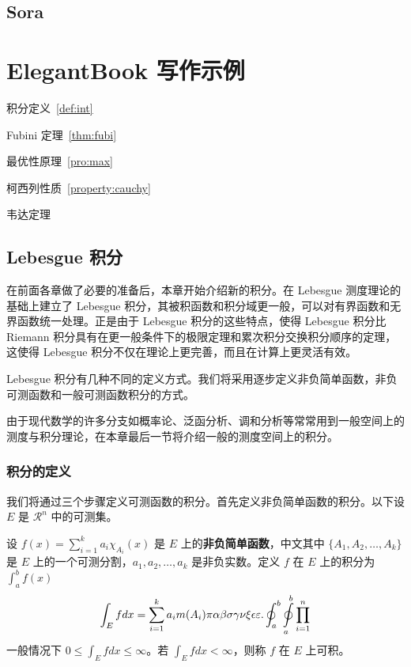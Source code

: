 \documentclass[lang=cn,newtx,10pt,scheme=chinese]{elegantbook}
\begin{document}
\section{Sora}




\chapter{ElegantBook 写作示例}

\begin{introduction}
  \item 积分定义~\ref{def:int}
  \item Fubini 定理~\ref{thm:fubi}
  \item 最优性原理~\ref{pro:max}
  \item 柯西列性质~\ref{property:cauchy}
  \item 韦达定理
\end{introduction}

\section{Lebesgue 积分}
在前面各章做了必要的准备后，本章开始介绍新的积分。在 Lebesgue 测度理论的基础上建立了 Lebesgue 积分，其被积函数和积分域更一般，可以对有界函数和无界函数统一处理。正是由于 Lebesgue 积分的这些特点，使得 Lebesgue 积分比 Riemann 积分具有在更一般条件下的极限定理和累次积分交换积分顺序的定理，这使得 Lebesgue 积分不仅在理论上更完善，而且在计算上更灵活有效。

Lebesgue 积分有几种不同的定义方式。我们将采用逐步定义非负简单函数，非负可测函数和一般可测函数积分的方式。

由于现代数学的许多分支如概率论、泛函分析、调和分析等常常用到一般空间上的测度与积分理论，在本章最后一节将介绍一般的测度空间上的积分。

\subsection{积分的定义}

我们将通过三个步骤定义可测函数的积分。首先定义非负简单函数的积分。以下设 $E$ 是 $\mathcal{R}^n$ 中的可测集。

\begin{definition}[可积性] \label{def:int} 
设 $ f(x)=\sum\limits_{i=1}^{k} a_i \chi_{A_i}(x)$ 是 $E$ 上的\textbf{非负简单函数}，中文其中 $\{A_1,A_2,\ldots,A_k\}$ 是 $E$ 上的一个可测分割，$a_1,a_2,\ldots,a_k$ 是非负实数。定义 $f$ 在 $E$ 上的积分为 $\int_{a}^b f(x)$
\begin{equation}
   \label{inter}
   \int_{E} f dx = \sum_{i=1}^k a_i m(A_i) \pi \alpha\beta\sigma\gamma\nu\xi\epsilon\varepsilon. \oint_{a}^b\ointop_{a}^b\prod_{i=1}^n
\end{equation}
一般情况下 $0 \leq \int_{E} f dx \leq \infty$。若 $\int_{E} f dx < \infty$，则称 $f$ 在 $E$ 上可积。
\end{definition}
\end{document}

